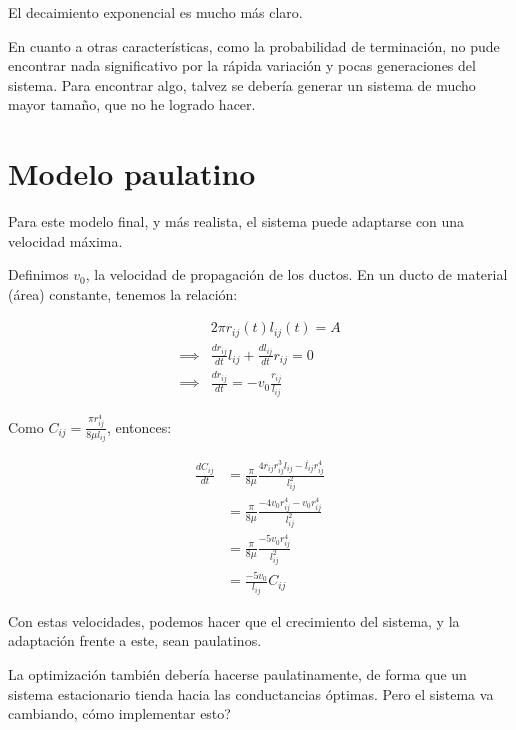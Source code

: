 \documentclass{article}
\begin{document}
El decaimiento exponencial es mucho más claro.

En cuanto a otras características, como la probabilidad de terminación, no pude encontrar nada significativo por la rápida variación y pocas generaciones del sistema.
Para encontrar algo, talvez se debería generar un sistema de mucho mayor tamaño, que no he logrado hacer.

\newpage
\section{Modelo paulatino}

Para este modelo final, y más realista, el sistema puede adaptarse con una velocidad máxima.

Definimos $v_0$, la velocidad de propagación de los ductos. En un ducto de material (área) constante, tenemos la relación:

\begin{align*}
    & 2\pi r_{ij}(t) l_{ij}(t) = A \\
    \implies & \frac{d r_{ij}}{dt} l_{ij} + \frac{d l_{ij}}{dt} r_{ij} = 0 \\
    \implies & \frac{d r_{ij}}{dt} = - v_0 \frac{r_{ij}}{l_{ij}}
\end{align*}

Como $C_{ij} = \frac{\pi r_{ij}^4}{8\mu l_{ij}}$, entonces:


\begin{align*}
    \frac{d C_{ij}}{dt} & = \frac{\pi}{8\mu} \frac{4 \dot{r_{ij}}r_{ij}^{3} l_{ij} - \dot{l_{ij}}r_{ij}^{4}}{l_{ij}^{2}}\\
    & = \frac{\pi}{8\mu} \frac{- 4v_0 r_{ij}^{4} - v_0 r_{ij}^{4}}{l_{ij}^{2}} \\
    & = \frac{\pi}{8\mu} \frac{- 5v_0 r_{ij}^{4}}{l_{ij}^{2}} \\
    & = \frac{-5 v_0}{l_{ij}} C_{ij}
\end{align*}

Con estas velocidades, podemos hacer que el crecimiento del sistema, y la adaptación frente a este, sean paulatinos.

La optimización también debería hacerse paulatinamente, de forma que un sistema estacionario tienda hacia las conductancias óptimas. Pero el sistema va cambiando, 
cómo implementar esto?
\end{document}
